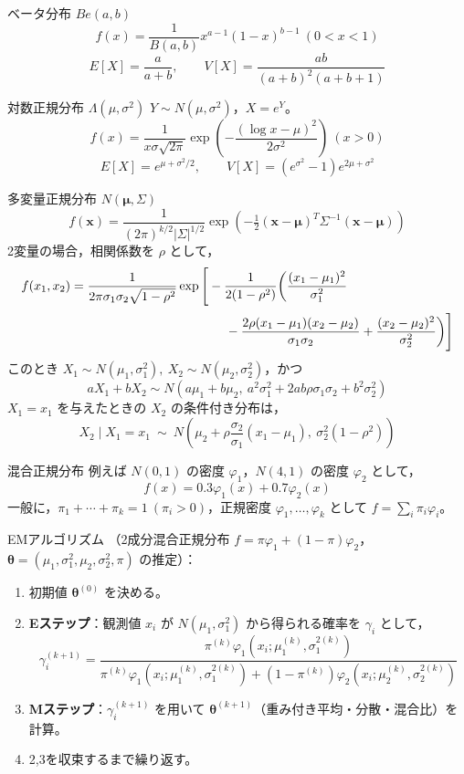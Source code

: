 \documentclass[a4paper,11pt]{ltjsarticle}
\begin{document}
\begin{term}{ベータ分布 $Be(a,b)$}
\[
f(x)=\frac{1}{B(a,b)}x^{a-1}(1-x)^{b-1}\ (0<x<1)
\]
\[
E[X]=\frac{a}{a+b},\qquad V[X]=\frac{ab}{(a+b)^2(a+b+1)}
\]
\end{term}

\begin{term}{対数正規分布 $\Lambda(\mu,\sigma^2)$}
$Y\sim N(\mu,\sigma^2)$，$X=e^Y$。
\[
f(x)=\frac{1}{x\sigma\sqrt{2\pi}}\exp\!\left(-\frac{(\log x-\mu)^2}{2\sigma^2}\right)\ (x>0)
\]
\[
E[X]=e^{\mu+\sigma^2/2},\qquad V[X]=(e^{\sigma^2}-1)e^{2\mu+\sigma^2}
\]
\end{term}

\begin{term}{多変量正規分布 $N(\bm\mu,\Sigma)$}
\[
f(\bm x) = \frac{1}{(2\pi)^{k/2}|\Sigma|^{1/2}}\exp\!\left(-\tfrac12(\bm x-\bm\mu)^T\Sigma^{-1}(\bm x-\bm\mu)\right)
\]
2変量の場合，相関係数を $\rho$ として，
\[
\begin{aligned}
f(x_1,x_2)={}&\frac{1}{2\pi\sigma_1\sigma_2\sqrt{1-\rho^2}}\exp\Bigg[-\frac{1}{2(1-\rho^2)}\bigg(\frac{(x_1-\mu_1)^2}{\sigma_1^2}\\[2pt]
&\hphantom{{}=\frac{1}{2\pi\sigma_1\sigma_2\sqrt{1-\rho^2}}\exp\Bigg[}-\frac{2\rho(x_1-\mu_1)(x_2-\mu_2)}{\sigma_1\sigma_2}+\frac{(x_2-\mu_2)^2}{\sigma_2^2}\bigg)\Bigg]
\end{aligned}
\]
このとき $X_1\sim N(\mu_1,\sigma_1^2),\ X_2\sim N(\mu_2,\sigma_2^2)$，かつ
\[
aX_1+bX_2 \sim N(a\mu_1+b\mu_2,\ a^2\sigma_1^2+2ab\rho\sigma_1\sigma_2+b^2\sigma_2^2)
\]
$X_1=x_1$ を与えたときの $X_2$ の条件付き分布は，
\[
X_2\mid X_1=x_1 \ \sim\ N\!\left(\mu_2+\rho\frac{\sigma_2}{\sigma_1}(x_1-\mu_1),\ \sigma_2^2(1-\rho^2)\right)
\]
\end{term}

\begin{term}{混合正規分布}
例えば $N(0,1)$ の密度 $\varphi_1$，$N(4,1)$ の密度 $\varphi_2$ として，
\[
f(x) = 0.3\varphi_1(x)+0.7\varphi_2(x)
\]
一般に，$\pi_1+\cdots+\pi_k=1\ (\pi_i>0)$，正規密度 $\varphi_1,\dots,\varphi_k$ として $f=\sum_i \pi_i\varphi_i$。
\end{term}

\begin{term}{EMアルゴリズム}
（2成分混合正規分布 $f=\pi\varphi_1+(1-\pi)\varphi_2$，$\bm\theta=(\mu_1,\sigma_1^2,\mu_2,\sigma_2^2,\pi)$ の推定）：
\begin{enumerate}[label=\arabic*.]
\item 初期値 $\bm\theta^{(0)}$ を決める。
\item \textbf{Eステップ}：観測値 $x_i$ が $N(\mu_1,\sigma_1^2)$ から得られる確率を $\gamma_i$ として，
\[
\gamma_i^{(k+1)} = \frac{\pi^{(k)}\varphi_1(x_i;\mu_1^{(k)},\sigma_1^{2(k)})}
{\pi^{(k)}\varphi_1(x_i;\mu_1^{(k)},\sigma_1^{2(k)}) + (1-\pi^{(k)})\varphi_2(x_i;\mu_2^{(k)},\sigma_2^{2(k)})}
\]
\item \textbf{Mステップ}：$\gamma_i^{(k+1)}$ を用いて $\bm\theta^{(k+1)}$（重み付き平均・分散・混合比）を計算。
\item 2,3を収束するまで繰り返す。
\end{enumerate}
\end{term}
\end{document}
